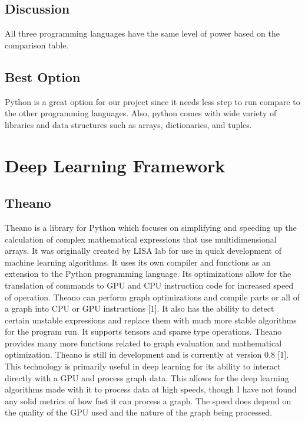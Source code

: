 \documentclass{scrreprt}
\begin{document}
\subsection{Discussion}
All three programming languages have the same level of power based on the comparison table.

\subsection{Best Option}
Python is a great option for our project since it needs less step to run compare to the other
programming languages. Also, python comes with wide variety of libraries and data structures such as
arrays, dictionaries, and tuples.


\section{Deep Learning Framework}

\subsection{Theano}
Theano is a library for Python which focuses on simplifying and speeding up the calculation of
complex mathematical expressions that use multidimensional arrays. It was originally created by
LISA lab for use in quick development of machine learning algorithms. It uses its own compiler
and functions as an extension to the Python programming language. Its optimizations allow for
the translation of commands to GPU and CPU instruction code for increased speed of operation.
Theano can perform graph optimizations and compile parts or all of a graph into CPU or GPU
instructions [1]. It also has the ability to detect certain unstable expressions and replace them
with much more stable algorithms for the program run. It supports tensors and sparse type
operations. Theano provides many more functions related to graph evaluation and mathematical
optimization. Theano is still in development and is currently at version 0.8 [1]. This technology
is primarily useful in deep learning for its ability to interact directly with a GPU and process
graph data. This allows for the deep learning algorithms made with it to process data at high
speeds, though I have not found any solid metrics of how fast it can process a graph. The speed
does depend on the quality of the GPU used and the nature of the graph being processed.
\end{document}
